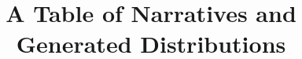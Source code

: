 \documentclass{book}
\begin{document}
\renewcommand{\comment}[1]{}
\title{A Table of Narratives and Generated Distributions}
\maketitle


\tableofcontents








\end{document}
